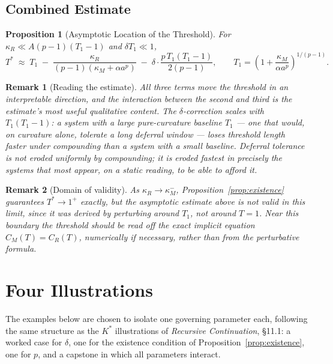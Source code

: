 \documentclass[11pt]{article}
\newtheorem{proposition}[definition]{Proposition}
\newtheorem*{remark}{Remark}
\begin{document}
\subsection{Combined Estimate}

\begin{proposition}[Asymptotic Location of the Threshold]
For $\kappa_R \ll A(p-1)(T_1-1)$ and $\delta T_1 \ll 1$,
\[
T^* \;\approx\; T_1 \;-\; \frac{\kappa_R}{(p-1)(\kappa_M + \alpha a^p)} \;-\; \delta\cdot\frac{p\,T_1(T_1-1)}{2(p-1)},
\qquad
T_1 = \left(1+\frac{\kappa_M}{\alpha a^p}\right)^{1/(p-1)}.
\]
\end{proposition}

\begin{remark}[Reading the estimate]
All three terms move the threshold in an interpretable direction, and the interaction between the second and third is the estimate's most useful qualitative content. The $\delta$-correction scales with $T_1(T_1 - 1)$: a system with a large pure-curvature baseline $T_1$ — one that would, on curvature alone, tolerate a long deferral window — loses threshold length \emph{faster} under compounding than a system with a small baseline. Deferral tolerance is not eroded uniformly by compounding; it is eroded fastest in precisely the systems that most appear, on a static reading, to be able to afford it.
\end{remark}

\begin{remark}[Domain of validity]
As $\kappa_R \to \kappa_M^-$, Proposition~\ref{prop:existence} guarantees $T^* \to 1^+$ exactly, but the asymptotic estimate above is not valid in this limit, since it was derived by perturbing around $T_1$, not around $T=1$. Near this boundary the threshold should be read off the exact implicit equation $C_M(T) = C_R(T)$, numerically if necessary, rather than from the perturbative formula.
\end{remark}

\section{Four Illustrations}

The examples below are chosen to isolate one governing parameter each, following the same structure as the $K^*$ illustrations of \emph{Recursive Continuation}, \S 11.1: a worked case for $\delta$, one for the existence condition of Proposition~\ref{prop:existence}, one for $p$, and a capstone in which all parameters interact.
\end{document}
